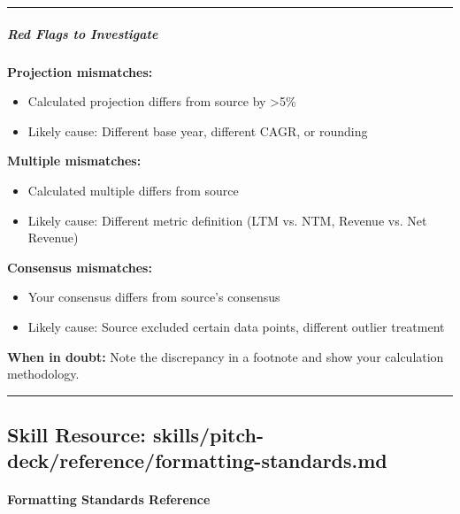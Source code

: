 \documentclass[11pt]{article}
\begin{document}
\vspace{0.5em}\hrule\vspace{0.5em}

\subparagraph{Red Flags to Investigate}\mbox{}\par

\textbf{Projection mismatches:}

\begin{itemize}[leftmargin=*,itemsep=2pt,topsep=2pt]
\item {} Calculated projection differs from source by >5\%
\item {} Likely cause: Different base year, different CAGR, or rounding
\end{itemize}

\textbf{Multiple mismatches:}

\begin{itemize}[leftmargin=*,itemsep=2pt,topsep=2pt]
\item {} Calculated multiple differs from source
\item {} Likely cause: Different metric definition (LTM vs. NTM, Revenue vs. Net Revenue)
\end{itemize}

\textbf{Consensus mismatches:}

\begin{itemize}[leftmargin=*,itemsep=2pt,topsep=2pt]
\item {} Your consensus differs from source's consensus
\item {} Likely cause: Source excluded certain data points, different outlier treatment
\end{itemize}

\textbf{When in doubt:} Note the discrepancy in a footnote and show your calculation methodology.


\vspace{0.8em}\hrule\vspace{0.8em}

\subsection{Skill Resource: skills/pitch-deck/reference/formatting-standards.md}\label{file:skills-pitch-deck-reference-formatting-standards.md}

\paragraph{Formatting Standards Reference}\mbox{}\par
\end{document}
